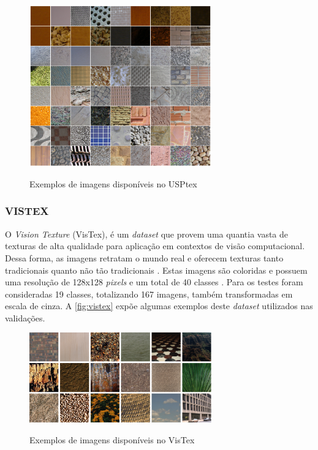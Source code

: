 \begin{figure}[!h]
    \centering
    \caption{Exemplos de imagens disponíveis no USPtex}
    \includegraphics[width=0.7\textwidth]{./dados/figuras/USPtex.png}
    \label{fig:usptex}
\end{figure}

\subsubsection{VISTEX}
\label{subsubsec:vistex}

\par O \textit{Vision Texture} (VisTex), é um \textit{dataset} que provem uma quantia vasta de texturas de alta qualidade para aplicação em contextos de visão computacional. Dessa forma, as imagens retratam o mundo real e oferecem texturas tanto tradicionais quanto não tão tradicionais \cite{vistex}. Estas imagens são coloridas e possuem uma resolução de 128x128 \textit{pixels} e um total de 40 classes \cite{fekri2019new}. Para os testes foram consideradas 19 classes, totalizando 167 imagens, também transformadas em escala de cinza. A \autoref{fig:vistex} expõe algumas exemplos deste \textit{dataset} utilizados nas validações.

\begin{figure}[H]
    \centering
    \caption{Exemplos de imagens disponíveis no VisTex}
    \includegraphics[width=0.7\textwidth]{./dados/figuras/vistex.png}
    \label{fig:vistex}
\end{figure}


